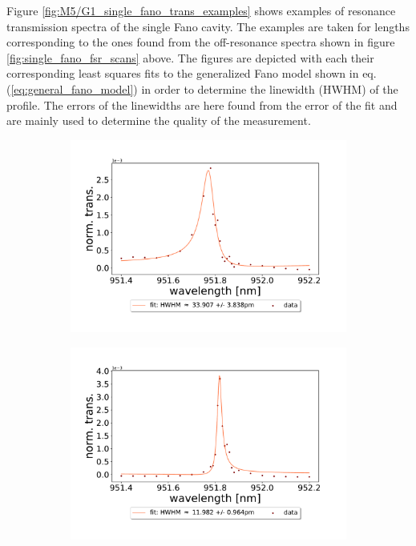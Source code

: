 Figure \ref{fig:M5/G1_single_fano_trans_examples} shows examples of resonance transmission spectra of the single Fano cavity. The examples are taken for lengths corresponding to the ones found from the off-resonance spectra shown in figure \ref{fig:single_fano_fsr_scans} above. The figures are depicted with each their corresponding least squares fits to the generalized Fano model shown in eq. (\ref{eq:general_fano_model}) in order to determine the linewidth (HWHM) of the profile. The errors of the linewidths are here found from the error of the fit and are mainly used to determine the quality of the measurement. 

\begin{figure}[h!]
    \centering
    \begin{subfigure}[b]{0.49\textwidth}
        \centering
        \includegraphics[width=\textwidth]{figures/results/single fano fits/60um_M5_fit_1.pdf}
        \caption{}
        \label{fig:short_single_fano_trans}
    \end{subfigure}
    \begin{subfigure}[b]{0.49\textwidth}
        \centering
        \includegraphics[width=\textwidth]{figures/results/single fano fits/220um_M5_fit_4.pdf}

\end{subfigure}
\end{figure}

